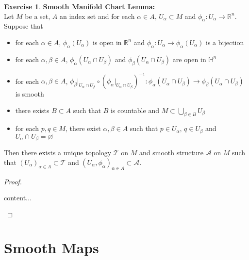 \documentclass{book}
\theoremstyle{definition}
\newtheorem{ex}[definition]{Exercise}
\newcommand{\al}{\alpha}
\newcommand{\be}{\beta}
\renewcommand{\H}{\mathbb{H}}
\newcommand{\R}{\mathbb{R}}
\newcommand{\MA}{\mathcal{A}}
\newcommand{\MT}{\mathcal{T}}
\DeclareMathOperator*{\0}{\mbf{0}}
\DeclareMathOperator*{\1}{\mbf{1}}
\newcommand{\tbf}[1]{\textbf{#1}}
\begin{document}
	\begin{ex} \tbf{Smooth Manifold Chart Lemma:} \\
		Let $M$ be a set, $A$ an index set and for each $\al \in A$, $U_{\al} \subset M$ and $\phi_{\al}: U_{\al} \rightarrow \R^n$. Suppose that 
		\begin{itemize}
			\item for each $\al \in A$, $\phi_{\al}(U_{\al})$ is open in $\R^n$ and $\phi_{\al}: U_{\al} \rightarrow \phi_{\al}(U_{\al})$ is a bijection
			\item for each $\al, \be \in A$, $\phi_{\al}(U_{\al} \cap U_{\be})$ and $\phi_{\be}(U_{\al} \cap U_{\be})$ are open in $\H^n$
			\item for each $\al, \be \in A$, $\phi_{\be}|_{U_{\al} \cap U_{\be}} \circ (\phi_{\al}|_{U_{\al} \cap U_{\be}})^{-1}: \phi_{\al}(U_{\al} \cap U_{\be}) \rightarrow \phi_{\be}(U_{\al} \cap U_{\be})$ is smooth
			\item there exists $B \subset A$ such that $B$ is countable and $M \subset \bigcup\limits_{\be \in B} U_{\be}$
			\item for each $p,q \in M$, there exist $\al,\be \in A$ such that $p \in U_{\al}$, $q \in U_{\be}$ and $U_{\al} \cap U_{\be} = \varnothing$
		\end{itemize}
		Then there exists a unique topology $\MT$ on $M$ and smooth structure $\MA$ on $M$ such that $(U_{\al})_{\al \in A} \subset \MT$ and $(U_{\al}, \phi_{\al})_{\al \in A} \subset \MA$.
	\end{ex}

	\begin{proof}
		\begin{enumerate}
			content...
		\end{enumerate}
	\end{proof}
	
	
	
	
	
	
	
	
	
	
	
	

	
	
	
	
	
	
	
	
	
	
	
	
	
	
	
	
	\newpage 
	\section{Smooth Maps}	
	
\end{document}
